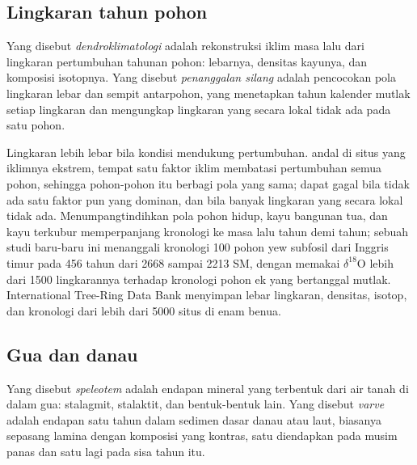 \subsection*{Lingkaran tahun pohon}

\begin{definition}\label{def:b2:climate-proxies:dendro}
Yang disebut \emph{dendroklimatologi} adalah rekonstruksi iklim masa lalu dari
lingkaran pertumbuhan tahunan pohon: lebarnya, densitas kayunya, dan komposisi
isotopnya. Yang disebut \emph{penanggalan silang} adalah pencocokan pola lingkaran lebar dan
sempit antarpohon, yang menetapkan tahun kalender mutlak setiap lingkaran dan mengungkap
lingkaran yang secara lokal tidak ada pada satu pohon.
\end{definition}

Lingkaran lebih lebar bila kondisi mendukung pertumbuhan.  andal di situs yang iklimnya ekstrem, tempat satu
faktor iklim membatasi pertumbuhan semua pohon, sehingga pohon-pohon itu berbagi pola yang sama;  dapat
gagal bila tidak ada satu faktor pun yang dominan, dan bila banyak lingkaran yang secara lokal tidak ada.
Menumpangtindihkan pola pohon hidup, kayu bangunan tua, dan kayu terkubur memperpanjang kronologi ke masa lalu
tahun demi tahun; sebuah studi baru-baru ini menanggali kronologi 100 pohon yew subfosil dari Inggris timur pada
456 tahun dari 2668 sampai 2213 SM, dengan memakai $\delta^{18}$O lebih dari \num{1500} lingkarannya
terhadap kronologi pohon ek yang bertanggal mutlak. International Tree-Ring Data Bank menyimpan lebar
lingkaran, densitas, isotop, dan kronologi dari lebih dari \num{5000} situs di enam benua.

\subsection*{Gua dan danau}

\begin{definition}\label{def:b2:climate-proxies:archives}
Yang disebut \emph{speleotem} adalah endapan mineral yang terbentuk dari air tanah di dalam
gua: stalagmit, stalaktit, dan bentuk-bentuk lain. Yang disebut \emph{varve} adalah
endapan satu tahun dalam sedimen dasar danau atau laut, biasanya sepasang lamina dengan
komposisi yang kontras, satu diendapkan pada musim panas dan satu lagi pada sisa tahun itu.
\end{definition}

